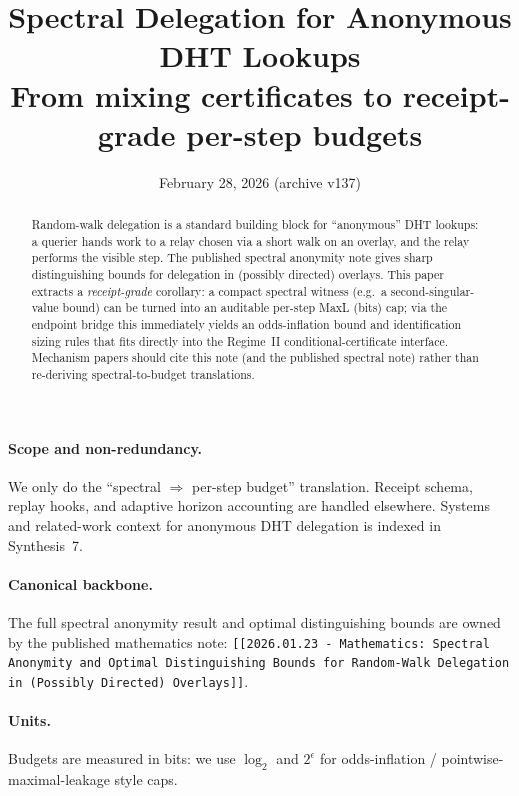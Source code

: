 \documentclass[11pt]{article}
\title{Spectral Delegation for Anonymous DHT Lookups\\
\large From mixing certificates to receipt-grade per-step budgets}
\author{}
\date{February 28, 2026 (archive v137)}
\begin{document}
\maketitle

\begin{abstract}
Random-walk delegation is a standard building block for ``anonymous'' DHT lookups:
a querier hands work to a relay chosen via a short walk on an overlay, and the relay performs the visible step.
The published spectral anonymity note gives sharp distinguishing bounds for delegation in (possibly directed) overlays.
This paper extracts a \emph{receipt-grade} corollary: a compact spectral witness (e.g.\ a second-singular-value bound)
can be turned into an auditable per-step MaxL (bits) cap; via the endpoint bridge this immediately yields an odds-inflation bound and identification sizing rules\cite{series:endpointbridge} that fits directly into the Regime~II conditional-certificate interface.
Mechanism papers should cite this note (and the published spectral note) rather than re-deriving spectral-to-budget translations.
\end{abstract}

\paragraph{Scope and non-redundancy.}
We only do the ``spectral $\Rightarrow$ per-step budget'' translation.
Receipt schema, replay hooks, and adaptive horizon accounting are handled elsewhere.\cite{series:receiptitems,series:condcert,series:accountingrulebook}
Systems and related-work context for anonymous DHT delegation is indexed in Synthesis~7.\cite{series:relatedworkmap}

\paragraph{Canonical backbone.}
The full spectral anonymity result and optimal distinguishing bounds are owned by the published mathematics note:
\texttt{[[2026.01.23 - Mathematics: Spectral Anonymity and Optimal Distinguishing Bounds for Random-Walk Delegation in (Possibly Directed) Overlays]]}.

\paragraph{Units.}
Budgets are measured in bits: we use $\log_2$ and $2^{\epsilon}$ for odds-inflation / pointwise-maximal-leakage style caps.\cite{series:notation}
\end{document}

